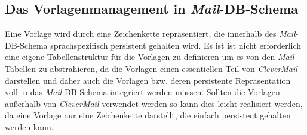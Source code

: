 \subsection{Das Vorlagenmanagement in \emph{Mail}-DB-Schema}
Eine Vorlage wird durch eine Zeichenkette repräsentiert, die innerhalb des \emph{Mail}-DB-Schema sprachspezifisch  persistent gehalten wird. Es ist ist nicht erforderlich eine eigene Tabellenstruktur für die Vorlagen zu definieren um es von den \emph{Mail}-Tabellen zu abstrahieren, da die Vorlagen einen essentiellen Teil von \emph{CleverMail} darstellen und daher auch die Vorlagen bzw. deren persistente Repräsentation voll in das \emph{Mail}-DB-Schema  integriert werden müssen. Sollten die Vorlagen außerhalb von \emph{CleverMail} verwendet werden so kann dies leicht realisiert werden, da eine Vorlage nur eine Zeichenkette darstellt, die einfach persistent gehalten werden kann.